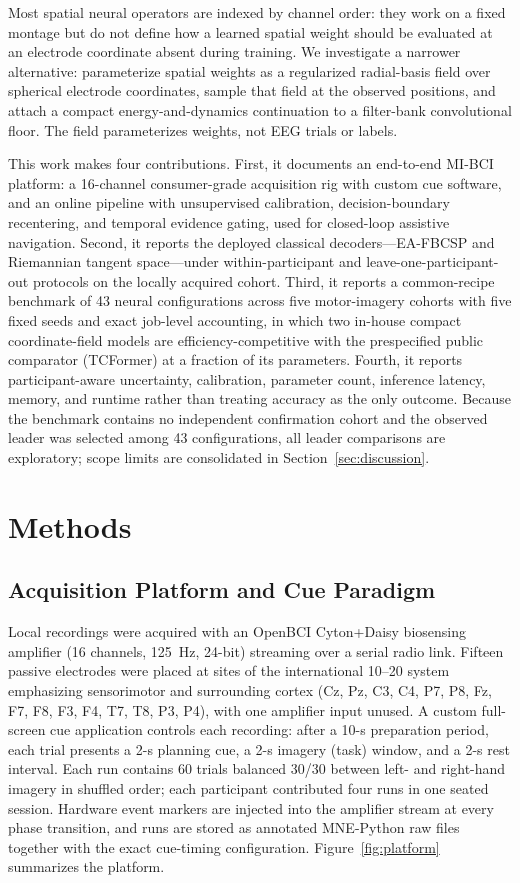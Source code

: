 \documentclass[journal,twoside,web]{template/ieeecolor2-tectonic}
\begin{document}
Most spatial neural operators are indexed by channel order: they work on a fixed montage but do not define how a learned spatial weight should be evaluated at an electrode coordinate absent during training. We investigate a narrower alternative: parameterize spatial weights as a regularized radial-basis field over spherical electrode coordinates, sample that field at the observed positions, and attach a compact energy-and-dynamics continuation to a filter-bank convolutional floor. The field parameterizes weights, not EEG trials or labels.

This work makes four contributions. First, it documents an end-to-end MI-BCI platform: a 16-channel consumer-grade acquisition rig with custom cue software, and an online pipeline with unsupervised calibration, decision-boundary recentering, and temporal evidence gating, used for closed-loop assistive navigation. Second, it reports the deployed classical decoders---EA-FBCSP and Riemannian tangent space---under within-participant and leave-one-participant-out protocols on the locally acquired cohort. Third, it reports a common-recipe benchmark of 43 neural configurations across five motor-imagery cohorts with five fixed seeds and exact job-level accounting, in which two in-house compact coordinate-field models are efficiency-competitive with the prespecified public comparator (TCFormer) at a fraction of its parameters. Fourth, it reports participant-aware uncertainty, calibration, parameter count, inference latency, memory, and runtime rather than treating accuracy as the only outcome. Because the benchmark contains no independent confirmation cohort and the observed leader was selected among 43 configurations, all leader comparisons are exploratory; scope limits are consolidated in Section~\ref{sec:discussion}.

\section{Methods}
\label{sec:methods}

\subsection{Acquisition Platform and Cue Paradigm}
\label{sec:platform}

Local recordings were acquired with an OpenBCI Cyton+Daisy biosensing amplifier (16 channels, 125~Hz, 24-bit) streaming over a serial radio link. Fifteen passive electrodes were placed at sites of the international 10--20 system emphasizing sensorimotor and surrounding cortex (Cz, Pz, C3, C4, P7, P8, Fz, F7, F8, F3, F4, T7, T8, P3, P4), with one amplifier input unused. A custom full-screen cue application controls each recording: after a 10-s preparation period, each trial presents a 2-s planning cue, a 2-s imagery (task) window, and a 2-s rest interval. Each run contains 60 trials balanced 30/30 between left- and right-hand imagery in shuffled order; each participant contributed four runs in one seated session. Hardware event markers are injected into the amplifier stream at every phase transition, and runs are stored as annotated MNE-Python raw files \cite{Gramfort2013} together with the exact cue-timing configuration. Figure~\ref{fig:platform} summarizes the platform.
\end{document}
